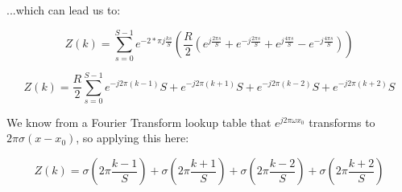 \documentclass{article}
\begin{document}
\noindent ...which can lead us to:

\begin{equation}
    Z(k) = \sum^{S-1}_{s=0} e^{-2*\pi j \frac{ks}{S}} (\frac{R}{2} (e^{j \frac{2 \pi s}{S}}+e^{-j \frac{2 \pi s}{S}} + e^{j \frac{4 \pi s}{S}} - e^{-j \frac{4 \pi s}{S}}))
\end{equation}

\begin{equation}
    Z(k) = \frac{R}{2} \sum^{S-1}_{s=0} e^{-j 2 \pi (k-1)}{S} + e^{-j 2 \pi (k+1)}{S} + e^{-j 2 \pi (k-2)}{S} + e^{-j 2 \pi (k+2)}{S}
\end{equation}

\noindent We know from a Fourier Transform lookup table that $e^{j 2 \pi \omega x_0}$ transforms to $2 \pi \sigma(x - x_0) $, so applying this here:

\begin{equation}
    Z(k) = \sigma(2 \pi \frac{k-1}{S}) + \sigma(2 \pi \frac{k+1}{S}) + \sigma(2 \pi \frac{k-2}{S}) + \sigma(2 \pi \frac{k+2}{S})
\end{equation}
\end{document}
